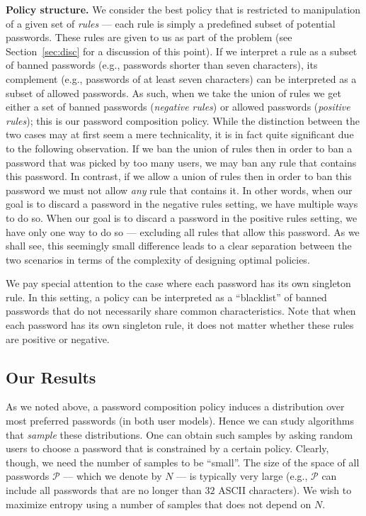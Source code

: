 \documentclass[prodmode,acmec]{ec-acmsmall}
\newcommand{\PasswordSpace}{\mathcal{P}}
\begin{document}
{\smallskip
\noindent\textbf{Policy structure.} 
We consider the best policy that is restricted to manipulation of a given set of \emph{rules} --- each rule is simply a predefined subset of potential passwords. These rules are given to us as part of the problem (see Section~\ref{sec:disc} for a discussion of this point). 
If we interpret a rule as a subset of banned passwords (e.g., passwords shorter than seven characters), its complement (e.g., passwords of at least seven characters) can be interpreted as a subset of allowed passwords. As such, when we take the union of rules we get either a set of banned passwords (\emph{negative rules}) or allowed passwords (\emph{positive rules}); this is our password composition policy. While the distinction between the two cases may at first seem a mere technicality, it is in fact quite significant due to the following observation. If we ban the union of rules then in order to ban a password that was picked by too many users, we may ban any rule that contains this password. In contrast, if we allow a union of rules then in order to ban this password we must not allow \emph{any} rule that contains it. In other words, when our goal is to discard a password in the negative rules setting, we have multiple ways to do so. When our goal is to discard a password in the positive rules setting, we have only one way to do so --- excluding all rules that allow this password. As we shall see, this seemingly small difference leads to a clear separation between the two scenarios in terms of the complexity of designing optimal policies. 

We pay special attention to the case where each password has its own singleton rule. In this setting, a policy can be interpreted as a ``blacklist'' of banned passwords that do not necessarily share common characteristics. Note that when each password has its own singleton rule, it does not matter whether these rules are positive or negative. 


\subsection{Our Results}
\label{subsec:results}

As we noted above, a password composition policy induces a distribution over most preferred passwords (in both user models). Hence we can study algorithms that \emph{sample} these distributions. One can obtain such samples by asking random users to choose a password that is constrained by a certain policy. Clearly, though, we need the number of samples to be ``small''. The size of the space of all passwords $\PasswordSpace$ --- which we denote by $N$ --- is typically very large (e.g., $\PasswordSpace$ can include all passwords that are no longer than $32$ ASCII characters). We wish to maximize entropy using a number of samples that does not depend on $N$. 

}
\end{document}
